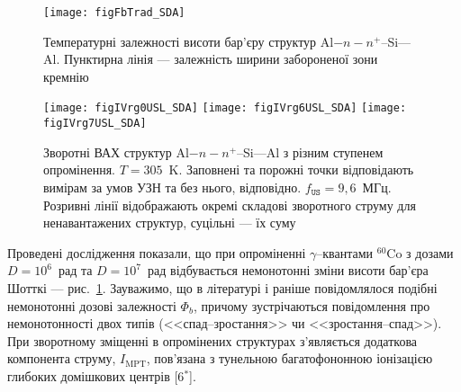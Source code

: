 \begin{figure}
\center
\texttt{[image: figFbTrad\_SDA]}
\caption{\label{figFbTrad_SDA}
Температурні залежності висоти бар'єру структур Al$-n-n^+$--Si---Al.
Пунктирна лінія --- залежність ширини забороненої зони кремнію
}%
\end{figure}



\begin{figure}[b]
\center
\texttt{[image: figIVrg0USL\_SDA]}\hfill
\texttt{[image: figIVrg6USL\_SDA]}\hfill
\texttt{[image: figIVrg7USL\_SDA]}
\caption{\label{figIVrg0USL_SDA}
Зворотні  ВАХ  структур Al$-n-n^+$--Si---Al з різним ступенем опромінення.
$T=305$~K.
Заповнені та порожні точки відповідають вимірам за умов УЗН та без нього, відповідно.
$f_\mathtt{US}=9,6$~МГц.
Розривні лінії відображають окремі складові зворотного струму для ненавантажених структур,
суцільні --- їх суму
}%
\end{figure}

Проведені дослідження показали, що при
опроміненні $\gamma$--квантами $^{60}$Co з дозами $D=10^6$~рад та $D=10^7$~рад відбувається
немонотонні зміни висоти бар'єра Шотткі --- рис.~\ref{figFbTrad_SDA}.
Зауважимо, що в літературі і раніше повідомлялося подібні немонотонні дозові залежності $\Phi_{b}$, причому зустрічаються повідомлення про немонотонності двох типів (<<спад--зростання>> чи <<зростання--спад>>).
При зворотному зміщенні в опромінених структурах з'являється додаткова компонента струму, $I_\mathrm{MPT}$,
пов'язана з тунельною багатофононною іонізацією глибоких домішкових центрів
[6$^*$].

